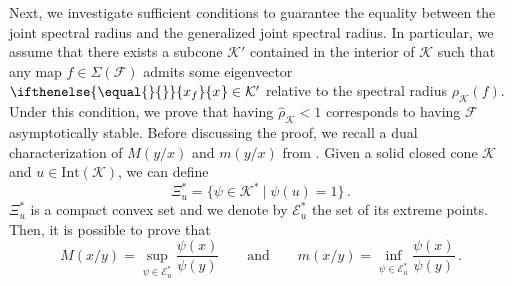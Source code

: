 \documentclass{article}
\newcommand{\family}{\mathcal{F}}
\newcommand{\cradius}{\rho_{\cone}}
\newcommand{\cgradius}{\widehat{\rho}_{\cone}}
\newcommand{\cone}{\mathcal{K}}
\newcommand{\interior}{\mathrm{Int}}
\newcommand{\ceigenvector}[1][]{
  \ifthenelse{\equal{#1}{}}
  {{x_f}}
  {{x}_{#1}}}
\begin{document}
Next, we investigate sufficient conditions to guarantee the equality between the joint spectral radius and the generalized joint spectral radius. In particular, we assume that there exists a subcone $\cone'$ contained in the interior of $\cone$ such that any map $f\in\Sigma(\family)$ admits some eigenvector $\ceigenvector\in \cone'$ relative to the spectral radius $\cradius(f)$.
Under this condition, we prove that having $\cgradius<1$ corresponds to having $\family$ asymptotically stable. Before discussing the proof, we recall a dual characterization of $M(y/x)$ and $m(y/x)$ from \cite{lemmens2012nonlinear}.
Given a solid closed cone $\cone$ and $u\in\interior(\cone)$, we can define
%
\begin{equation}
    \Xi_u^*=\{\psi\in\cone^*\:|\;\psi(u)=1\}\,.
\end{equation}
%
$\Xi_u^*$ is a compact convex set and we denote by $\mathcal{E}_u^*$ the set of its extreme points. Then, it is possible to prove that 
%
\begin{equation}\label{dual_expression_M_m}
M(x/y)=\sup_{\psi\in\mathcal{E}_u^*}\frac{\psi(x)}{\psi(y)}\qquad \mathrm{and}\qquad m(x/y)=\inf_{\psi\in\mathcal{E}_u^*}\frac{\psi(x)}{\psi(y)}\,.
\end{equation}
\end{document}
